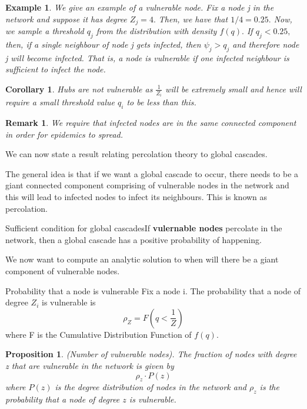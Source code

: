 \documentclass[twoside]{article}
\newtheorem{proposition}[theorem]{Proposition}
\newtheorem{corollary}[theorem]{Corollary}
\newtheorem{remark}[theorem]{Remark}
\newtheorem{example}[theorem]{Example}
\begin{document}
\begin{example}We give an example of a vulnerable node. Fix a node j in the network and suppose it has degree $Z_j = 4.$ Then, we have that $1/4 = 0.25.$ Now, we sample a threshold $q_j$ from the distribution with density $f(q).$ If $q_j < 0.25,$ then, if a single neighbour of node j gets infected, then $\psi_j > q_j$ and therefore node j will become infected. That is, a node is vulnerable if one infected neighbour is sufficient to infect the node.
\end{example}

\begin{corollary}Hubs are not vulnerable as $\frac{1}{Z_i}$ will be extremely small and hence will require a small threshold value $q_i$ to be less than this.
\end{corollary}
\begin{remark}We require that infected nodes are in the same connected component in order for epidemics to spread.
\end{remark}

We can now state a result relating percolation theory to global cascades.

The general idea is that if we want a global cascade to occur, there needs to be a giant connected component comprising of vulnerable nodes in the network and this will lead to infected nodes to infect its neighbours. This is known as percolation.

\begin{theorem_exam}{Sufficient condition for global cascades}{}If \textbf{vulernable nodes} percolate in the network, then a global cascade has a positive probability of happening.
\end{theorem_exam}

We now want to compute an analytic solution to when will there be a giant component of vulnerable nodes.

\begin{definition_exam}{Probability that a node is vulnerable}{} Fix a node i. The probability that a node of degree $Z_i$ is vulnerable is 
$$
\rho_Z = F(q < \frac{1}{Z})
$$
where F is the Cumulative Distribution Function of $f(q).$
\end{definition_exam}

\begin{proposition}(Number of vulnerable nodes). The fraction of nodes with degree z that are vulnerable in the network is given by 
$$
\rho_z \cdot P(z)
$$
where $P(z)$ is the degree distribution of nodes in the network and $\rho_z$ is the probability that a node of degree $z$ is vulnerable.
\end{proposition}
\end{document}

